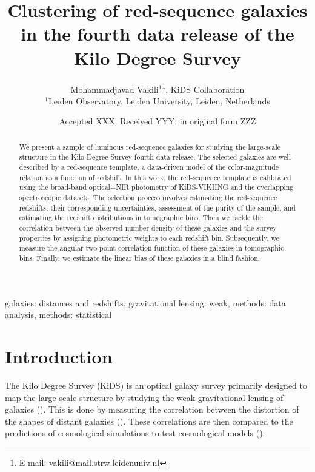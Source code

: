 \documentclass[fleqn,usenatbib,useAMS]{mnras}
\title[KiDS DR4 LRG clustering]{Clustering of red-sequence galaxies in the fourth data release of the Kilo Degree Survey}
\author[M. Vakili et al.]{
Mohammadjavad Vakili$^{1}$\thanks{E-mail: vakili@mail.strw.leidenuniv.nl}, KiDS Collaboration\\
$^{1}$Leiden Observatory, Leiden University, Leiden, Netherlands
}
\date{Accepted XXX. Received YYY; in original form ZZZ}
\begin{document}
\label{firstpage}
\pagerange{\pageref{firstpage}--\pageref{lastpage}}
\maketitle

\begin{abstract}

We present a sample of luminous red-sequence galaxies for studying the large-scale structure in the Kilo-Degree Survey fourth data release. The selected galaxies are well-described by a red-sequence template, a data-driven model of the color-magnitude relation as a function of redshift. In this work, the red-sequence template is calibrated using the broad-band optical+NIR photometry of KiDS-VIKIING and the overlapping spectroscopic datasets. The selection process involves estimating the red-sequence redshifts, their corresponding uncertainties, assessment of the purity of the sample, and estimating the redshift distributions in tomographic bins. Then we tackle the correlation between the observed number density of these galaxies and the survey properties by assigning photometric weights to each redshift bin. Subsequently, we measure the angular two-point correlation function of these galaxies in tomographic bins. Finally, we estimate the linear bias of these galaxies in a blind fashion. 

\end{abstract}

\begin{keywords}
galaxies: distances and redshifts, gravitational lensing: weak, methods: data analysis, methods: statistical
\end{keywords}


\section{Introduction}

The Kilo Degree Survey (KiDS) is an optical galaxy survey primarily designed to map the large scale structure by studying the weak gravitational lensing of galaxies (\citealt{kuijken2015, kuijken2019}). This is done by measuring the correlation between the distortion of the shapes of distant galaxies (\citealt{hendrick2017,hendrik2018}). These correlations are then compared to the predictions of cosmological simulations to test cosmological models (\citealt{heymans2013,jee2016,hendrick2017,joudaki2017,troxel2017,joudaki2019, hikage2019}). 
\end{document}
